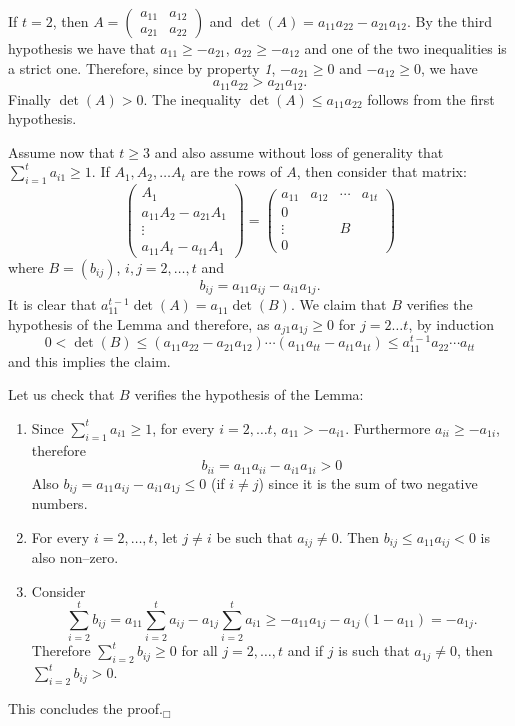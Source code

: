 \documentclass[a4paper,twoside]{article}
\begin{document}
If $t=2$, then $A=\left(\begin{array}{cc}
a_{11}&a_{12}\\ a_{21}&a_{22}
\end{array}\right)$ and
$\det(A)=a_{11}a_{22}-a_{21}a_{12}.$ By the third hypothesis we
have that $a_{11}\geq -a_{21}$, $a_{22}\geq -a_{12}$ and one of
the two inequalities is a strict one. Therefore, since by property
\textit{1}, $-a_{21}\geq0$ and $-a_{12}\geq0$, we have
$$a_{11}a_{22}>a_{21}a_{12}.$$
Finally $\det(A)>0$. The inequality $\det(A)\leq a_{11}a_{22}$ follows
from the first hypothesis.

Assume now that $t\geq3$ and also assume without loss of
generality that $\displaystyle{\sum_{i=1}^ta_{i1}}\geq1$. If
$A_1,A_2,\ldots A_t$ are the rows of $A$, then consider that
matrix:
$$\left(\begin{array}{c}
A_1\\ a_{11}A_2- a_{21}A_1\\
\vdots \\ a_{11}A_t-a_{t1}A_1\end{array}\right)=
\left(\begin{array}{cccc}
a_{11} & a_{12} & \cdots & a_{1t}\\
0 & & &\\
\vdots && B & \\
0 & & &
\end{array}\right)
$$
where
$B=(b_{ij})$, $i,j=2,\ldots,t$ and
$$b_{ij}=a_{11}a_{ij}-a_{i1}a_{1j}.$$
It is clear that $a_{11}^{t-1}\det(A)=a_{11}\det(B)$.
We claim that $B$ verifies the hypothesis of the Lemma and
therefore, as $a_{j1}a_{1j}\ge0$ for $j=2\ldots t$, by induction
$$0<\det(B)\leq (a_{11}a_{22}-a_{21}a_{12})\cdots
(a_{11}a_{tt}-a_{t1}a_{1t})\leq a_{11}^{t-1}a_{22}\cdots a_{tt}$$
and this implies the claim.

Let us check that $B$ verifies the hypothesis of the Lemma:
\begin{enumerate}
\item Since
$\displaystyle{\sum_{i=1}^ta_{i1}}\geq1$, for every $i=2,\ldots t$,
$a_{11}>-a_{i1}$. Furthermore $a_{ii}\geq -a_{1i}$, therefore
$$b_{ii}=a_{11}a_{ii}-a_{i1}a_{1i}>0$$
Also $b_{ij}=a_{11}a_{ij}-a_{i1}a_{1j}\leq0$ (if $i\neq j$) since
it is the sum of two negative numbers. \item For every
$i=2,\ldots,t$, let $j\neq i$ be such that $a_{ij}\neq0$. Then
$b_{ij}\leq a_{11}a_{ij}<0$ is also non--zero. \item Consider
$$\sum_{i=2}^t b_{ij}=a_{11}\sum_{i=2}^t a_{ij}-a_{1j}
\sum_{i=2}^t a_{i1}\geq -a_{11}a_{1j}-a_{1j}(1-a_{11})=
-a_{1j}.$$
Therefore $\sum_{i=2}^t b_{ij}\geq0$ for all $j=2,\ldots,t$ and if
$j$ is such that $a_{1j}\neq0$, then $\sum_{i=2}^t b_{ij}>0$.
\end{enumerate}
This concludes the proof.\hfill$_\Box$\medskip
\end{document}
